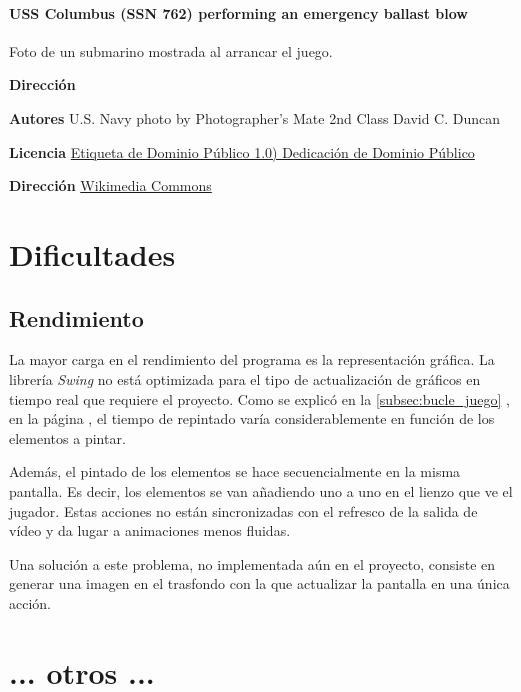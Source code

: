 \documentclass[a4paper,
	11pt,
	parskip=full,
	bibliography=totoc,
	twoside
	]{scrartcl}
\let\oldsection\section
\def\section{\cleardoubleoddpage\oldsection}
\begin{document}
	\paragraph{USS Columbus (SSN 762) performing an emergency ballast blow}
	Foto de un submarino mostrada al arrancar el juego.
	\begin{labeling}{\textbf{Dirección}}
		\item[\textbf{Autores}] U.S. Navy photo by Photographer's Mate 2nd Class David C. Duncan
		\item[\textbf{Licencia}] \href{https://creativecommons.org/publicdomain/mark/1.0/deed.es_ES}{Etiqueta de Dominio Público 1.0)
			Dedicación de Dominio Público}
		\item[\textbf{Dirección}]\href{https://commons.wikimedia.org/wiki/File:980604-N-7726D-002_Submarine_Emergency_Surfacing_Drill.jpg}{Wikimedia Commons}
	\end{labeling}

\section{Dificultades}
\label{sec:dificultades}
	\subsection{Rendimiento}
	\label{subsec:rendimiento}
		La mayor carga en el rendimiento del programa es la representación gráfica. La librería \textit{Swing} no está optimizada para el tipo de actualización de gráficos en tiempo real que requiere el proyecto. Como se explicó en la \autoref{subsec:bucle_juego} , en la página \pageref{subsec:bucle_juego}, el tiempo de repintado varía considerablemente en función de los elementos a pintar.
		
		Además, el pintado de los elementos se hace secuencialmente en la misma pantalla. Es decir, los elementos se van añadiendo uno a uno en el lienzo que ve el jugador. Estas acciones no están sincronizadas con el refresco de la salida de vídeo y da lugar a animaciones menos fluidas.
		
		Una solución a este problema, no implementada aún en el proyecto, consiste en generar una imagen en el trasfondo con la que actualizar la pantalla en una única acción.

\section{ ... otros ...}
\end{document}
